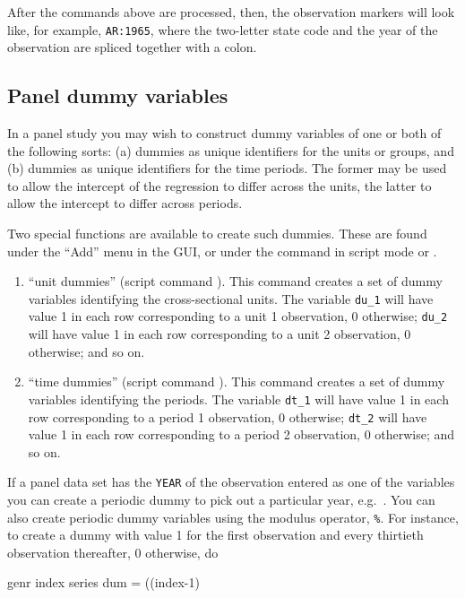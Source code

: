 After the commands above are processed, then, the observation markers
will look like, for example, \texttt{AR:1965}, where the two-letter
state code and the year of the observation are spliced together with a
colon.

\subsection{Panel dummy variables}
\label{panel-dummies}

In a panel study you may wish to construct dummy variables of one or
both of the following sorts: (a) dummies as unique identifiers for the
units or groups, and (b) dummies as unique identifiers for the time
periods.  The former may be used to allow the intercept of the
regression to differ across the units, the latter to allow the
intercept to differ across periods.

Two special functions are available to create such dummies.  These are
found under the ``Add'' menu in the GUI, or under the 
command in script mode or .

\begin{enumerate}
\item ``unit dummies'' (script command ).  This
  command creates a set of dummy variables identifying the
  cross-sectional units.  The variable \verb+du_1+ will have value 1
  in each row corresponding to a unit 1 observation, 0 otherwise;
  \verb+du_2+ will have value 1 in each row corresponding to a unit 2
  observation, 0 otherwise; and so on.
\item ``time dummies'' (script command ).  This
  command creates a set of dummy variables identifying the periods.
  The variable \verb+dt_1+ will have value 1 in each row
  corresponding to a period 1 observation, 0 otherwise; \verb+dt_2+
  will have value 1 in each row corresponding to a period 2
  observation, 0 otherwise; and so on.
\end{enumerate}

If a panel data set has the \verb+YEAR+ of the observation entered as
one of the variables you can create a periodic dummy to pick out a
particular year, e.g.\ .  You can also
create periodic dummy variables using the modulus operator,
\verb+%+.  For instance, to create a dummy with
value 1 for the first observation and every thirtieth observation
thereafter, 0 otherwise, do
%
\begin{code}
genr index 
series dum = ((index-1) %
\end{code}

